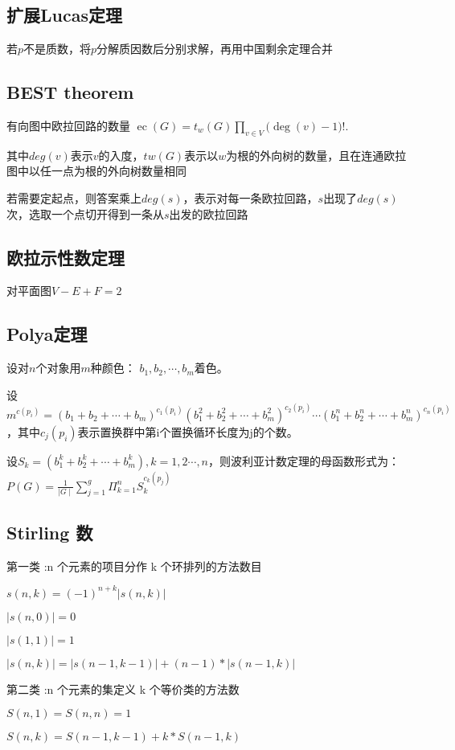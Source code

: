 \subsection{扩展Lucas定理}
若$p$不是质数，将$p$分解质因数后分别求解，再用中国剩余定理合并\par

\subsection{BEST theorem}
有向图中欧拉回路的数量
 ${\displaystyle \operatorname {ec} (G)=t_{w}(G)\prod _{v\in V}{\bigl (}\deg(v)-1{\bigr )}!.} $ \par
其中$deg(v)$表示$v$的入度，$tw(G)$表示以$w$为根的外向树的数量，且在连通欧拉图中以任一点为根的外向树数量相同\par
若需要定起点，则答案乘上$deg(s)$，表示对每一条欧拉回路，$s$出现了$deg(s)$次，选取一个点切开得到一条从$s$出发的欧拉回路

\subsection{欧拉示性数定理}
对平面图$V-E+F=2$\par

\subsection{Polya定理}
设对$n$个对象用$m$种颜色： ${\displaystyle b_{1},b_{2},\cdots ,b_{m}}$着色。\par
设${\displaystyle m^{c(p_{i})}=(b_{1}+b_{2}+\cdots +b_{m})^{c_{1}(p_{i})}(b_{1}^{2}+b_{2}^{2}+\cdots +b_{m}^{2})^{c_{2}(p_{i})}\cdots (b_{1}^{n}+b_{2}^{n}+\cdots +b_{m}^{n})^{c_{n}(p_{i})}}$，其中${\displaystyle c_{j}(p_{i})}$表示置换群中第i个置换循环长度为j的个数。\par
设${\displaystyle S_{k}=(b_{1}^{k}+b_{2}^{k}+\cdots +b_{m}^{k}),k=1,2\cdots ,n}$，则波利亚计数定理的母函数形式为：${\displaystyle P(G)={\frac {1}{\mid G\mid }}\sum _{j=1}^{g}\Pi _{k=1}^{n}S_{k}^{c_{k}(p_{j})}}$\par
\subsection{Stirling 数}
第一类 :n 个元素的项目分作 k 个环排列的方法数目\par
$s(n, k) = (-1)^{n+k}|s(n, k)|$\par
$|s(n, 0)| =0$\par
$|s(1, 1)| =1$\par
$|s(n, k)| =|s(n-1, k-1)|+(n-1)*|s(n-1, k)|$\par
第二类 :n 个元素的集定义 k 个等价类的方法数\par
$    S(n,1)=S(n,n)=1$\par
 $   S(n,k)=S(n-1,k-1)+k*S(n-1,k)$\par

